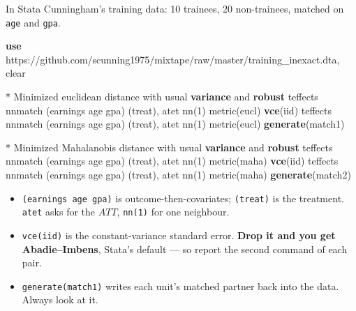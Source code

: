 \documentclass[
  11pt,
  ignorenonframetext,
  aspectratio=169,
]{beamer}
\newenvironment{Shaded}{\begin{snugshade}}{\end{snugshade}}
\newcommand{\CommentTok}[1]{\textcolor[rgb]{0.37,0.37,0.37}{#1}}
\newcommand{\KeywordTok}[1]{\textcolor[rgb]{0.00,0.23,0.31}{\textbf{#1}}}
\newcommand{\NormalTok}[1]{\textcolor[rgb]{0.00,0.23,0.31}{#1}}
\providecommand{\tightlist}{%
  \setlength{\itemsep}{0pt}\setlength{\parskip}{0pt}}
\begin{document}
\begin{frame}[fragile]{In Stata}
\protect{}\label{in-stata}
Cunningham's training data: 10 trainees, 20 non-trainees, matched on
\texttt{age} and \texttt{gpa}.

\footnotesize

\begin{Shaded}
\begin{Highlighting}[]
\KeywordTok{use}\NormalTok{ https:}\CommentTok{//github.com/scunning1975/mixtape/raw/master/training\_inexact.dta, clear}

\NormalTok{* Minimized euclidean distance with usual }\KeywordTok{variance}\NormalTok{ and }\KeywordTok{robust}
\NormalTok{teffects nnmatch (earnings age gpa) (treat), atet nn(1) metric(eucl) }\KeywordTok{vce}\NormalTok{(iid)}
\NormalTok{teffects nnmatch (earnings age gpa) (treat), atet nn(1) metric(eucl) }\KeywordTok{generate}\NormalTok{(match1)}

\NormalTok{* Minimized Mahalanobis distance with usual }\KeywordTok{variance}\NormalTok{ and }\KeywordTok{robust}
\NormalTok{teffects nnmatch (earnings age gpa) (treat), atet nn(1) metric(maha) }\KeywordTok{vce}\NormalTok{(iid)}
\NormalTok{teffects nnmatch (earnings age gpa) (treat), atet nn(1) metric(maha) }\KeywordTok{generate}\NormalTok{(match2)}
\end{Highlighting}
\end{Shaded}

\normalsize

\begin{itemize}
\tightlist
\item
  \texttt{(earnings\ age\ gpa)} is outcome-then-covariates;
  \texttt{(treat)} is the treatment. \texttt{atet} asks for the \(ATT\),
  \texttt{nn(1)} for one neighbour.
\item
  \texttt{vce(iid)} is the constant-variance standard error.
  \textbf{Drop it and you get Abadie--Imbens}, Stata's default --- so
  report the second command of each pair.
\item
  \texttt{generate(match1)} writes each unit's matched partner back into
  the data. Always look at it.
\end{itemize}
\end{frame}
\end{document}
